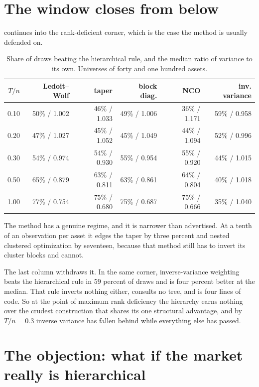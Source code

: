 \documentclass[11pt]{article}
\begin{document}
\section{The window closes from below}

 continues into the rank-deficient corner, which is the case
the method is usually defended on.

\begin{table}[ht]
\centering
\small
\begin{tabular}{rrrrrr}
\toprule
$T/n$ & Ledoit--Wolf & taper & block diag. & NCO & inv. variance \\
\midrule
0.10 & 50\% / 1.002 & 46\% / 1.033 & 49\% / 1.006 & 36\% / 1.171 & 59\% / 0.958 \\
0.20 & 47\% / 1.027 & 45\% / 1.052 & 45\% / 1.049 & 44\% / 1.094 & 52\% / 0.996 \\
0.30 & 54\% / 0.974 & 54\% / 0.930 & 55\% / 0.954 & 55\% / 0.920 & 44\% / 1.015 \\
0.50 & 65\% / 0.879 & 63\% / 0.811 & 63\% / 0.861 & 64\% / 0.804 & 40\% / 1.018 \\
1.00 & 77\% / 0.754 & 75\% / 0.680 & 75\% / 0.687 & 75\% / 0.666 & 35\% / 1.040 \\
\bottomrule
\end{tabular}
\caption{Share of draws beating the hierarchical rule, and the median ratio
of variance to its own. Universes of forty and one hundred assets.}
\label{tab:deep}
\end{table}

The method has a genuine regime, and it is narrower than advertised. At a
tenth of an observation per asset it edges the taper by three percent and
nested clustered optimization by seventeen, because that method still has to
invert its cluster blocks and cannot.

The last column withdraws it. In the same corner, inverse-variance weighting
beats the hierarchical rule in 59 percent of draws and is four percent better
at the median. That rule inverts nothing either, consults no tree, and is
four lines of code. So at the point of maximum rank deficiency the hierarchy
earns nothing over the crudest construction that shares its one structural
advantage, and by $T/n = 0.3$ inverse variance has fallen behind while
everything else has passed.

\section{The objection: what if the market really is hierarchical}
\end{document}
